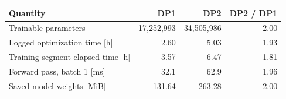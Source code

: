 \begingroup\small\setlength{\tabcolsep}{4pt}\renewcommand{\arraystretch}{1.1}
\begin{tabular}{@{}lrrr@{}}
\toprule
Quantity & DP1 & DP2 & DP2 / DP1 \\ \midrule
Trainable parameters & 17,252,993 & 34,505,986 & 2.00 \\
Logged optimization time [h] & 2.60 & 5.03 & 1.93 \\
Training segment elapsed time [h] & 3.57 & 6.47 & 1.81 \\
Forward pass, batch 1 [ms] & 32.1 & 62.9 & 1.96 \\
Saved model weights [MiB] & 131.64 & 263.28 & 2.00 \\
\bottomrule
\end{tabular}\endgroup
